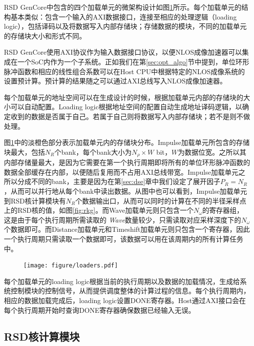 \documentclass[master]{shtthesis}             %
\begin{document}
RSD GenCore中包含的四个加载单元的微架构设计如图\ref{fig:loaders}所示。每个加载单元的结构基本类似：包含一个输入的AXI数据接口，连接至相应的处理逻辑（loading logic），包括译码以及将数据写入内部存储块；存储数据的模块，不同的加载单元的存储块大小和形式不同。

RSD GenCore使用AXI协议作为输入数据接口协议，以便NLOS成像加速器可以集成在一个SoC内作为一个子系统。正如我们在第\ref{sec:opt_algo}节中提到，单位环形脉冲函数和相应的线性组合系数可以在Host CPU中根据特定的NLOS成像系统的设置预计算。预计算的结果随之可以通过AXI总线写入NLOS成像加速器。

每个加载单元的地址空间可以在生成设计的时候，根据加载单元内部的存储块的大小可以自动配置。Loading logic根据地址空间的配置自动生成地址译码逻辑，以确定收到的数据是否属于自己。若属于自己则将数据写入内部存储块；若不是则不做处理。

图\ref{fig:loaders}中的淡橙色部分表示加载单元内的存储块分布。Impulse加载单元所包含的存储块最大，包括$N_R$个bank，每个bank大小为$N_\rho\times W$ bit，$W$为数据位宽。之所以其内部存储量最大，是因为它需要在第一个执行周期即将所有的单位环形脉冲函数的数据全部缓存在内部，以便随后复用而不占用AXI总线带宽。Impulse加载单元之所以分成不同的bank，主要是因为在第\ref{sec:dse}章中我们设定了展开因子$P_R=N_R$，从而可以并行地从每个bank中读出数据。从图中也可以看到，Impulse加载单元到RSD核计算模块有$N_R$个数据输出口，从而可以同时的计算在不同的半径采样点上的RSD核的值，如图\ref{fig:rkg}。而Wave加载单元则只包含一个$N_\omega$的寄存器组，这是由于每个执行周期所需读取的 \textit{Wave}数量较少，只需读取对应采样深度下的$N_\omega$个数据即可。而Distance加载单元和Timeshift加载单元则只包含一个寄存器，因此一个执行周期只需读取一个数据即可，该数据可以用在该周期内的所有计算任务中。

\begin{figure}[!tb]
  \centering
  \texttt{[image: figure/loaders.pdf]}
  \label{fig:loaders}
\end{figure}

每个加载单元的loading logic根据当前的执行周期以及数据的加载情况，生成给系统控制模块的控制信号，从而提供调度整体的计算过程的信息。每个执行周期内，相应的数据加载完成后，loading logic设置DONE寄存器。Host通过AXI接口会在每个执行周期开始时查询DONE寄存器确保数据已经输入无误。

\subsection{RSD核计算模块} 
\end{document}
